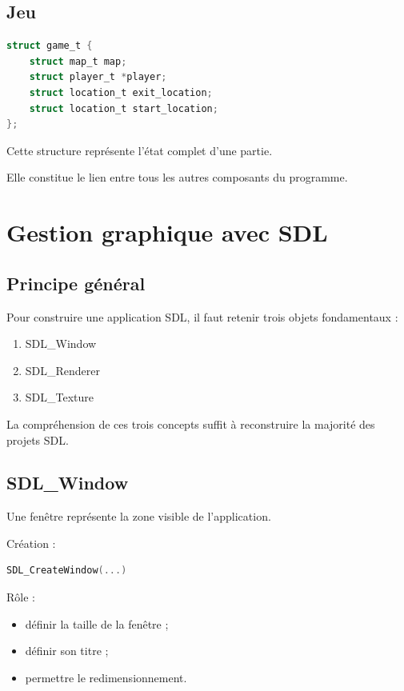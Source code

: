 \documentclass[a4paper,11pt]{article}
\begin{document}
\subsection{Jeu}

\begin{lstlisting}[language=C]
struct game_t {
    struct map_t map;
    struct player_t *player;
    struct location_t exit_location;
    struct location_t start_location;
};
\end{lstlisting}

Cette structure représente l'état complet d'une partie.

Elle constitue le lien entre tous les autres composants du programme.

\section{Gestion graphique avec SDL}

\subsection{Principe général}

Pour construire une application SDL, il faut retenir trois objets fondamentaux :

\begin{enumerate}
    \item SDL\_Window
    \item SDL\_Renderer
    \item SDL\_Texture
\end{enumerate}

La compréhension de ces trois concepts suffit à reconstruire la majorité des projets SDL.

\subsection{SDL\_Window}

Une fenêtre représente la zone visible de l'application.

Création :

\begin{lstlisting}[language=C]
SDL_CreateWindow(...)
\end{lstlisting}

Rôle :

\begin{itemize}
    \item définir la taille de la fenêtre ;
    \item définir son titre ;
    \item permettre le redimensionnement.
\end{itemize}
\end{document}
